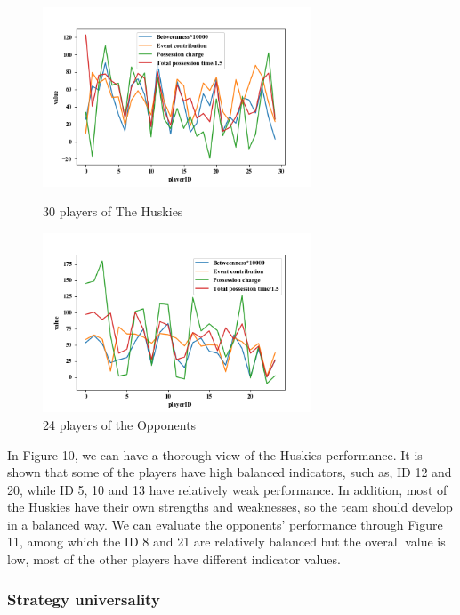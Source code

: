 \documentclass{mcmthesis}
\begin{document}
{\begin{figure}[h]
	\begin{minipage}[t]{0.5\textwidth}
		\centering
		\includegraphics[width=8cm]{value_of_player_per_season_Huskies_30player.png}
		\caption{30 players of The Huskies \label{fig:aa}}
	\end{minipage}
	\qquad
	\begin{minipage}[t]{0.5\textwidth}
		\centering
		\includegraphics[width=8cm]{value_of_player_per_season_Opponents_24player.png}
		\caption{24 players of the Opponents\label{fig:aa}}
	\end{minipage}
\end{figure}


In Figure 10, we can have a thorough view of the Huskies performance. It is shown that some of the players have high balanced indicators, such as, ID 12 and 20, while ID 5, 10 and 13 have relatively weak performance. In addition, most of the Huskies have their own strengths and weaknesses, so the team should develop in a balanced way. We can evaluate the opponents' performance through Figure 11, among which the ID 8 and 21 are relatively balanced but the overall value is low, most of the other players have different indicator values.

\subsubsection{Strategy universality}

}
\end{document}
